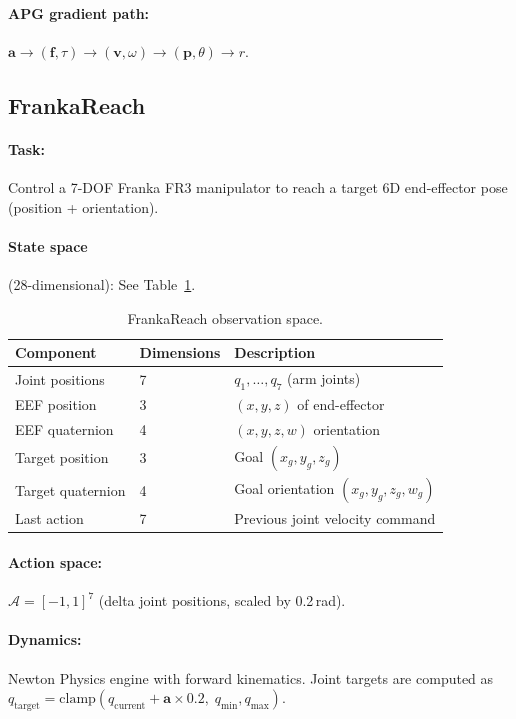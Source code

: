 \documentclass[11pt,a4paper]{article}
\newcommand{\cA}{\mathcal{A}}
\newcommand{\bvf}{\mathbf{v}}
\newcommand{\bpf}{\mathbf{p}}
\newcommand{\bff}{\mathbf{f}}
\newcommand{\ba}{\mathbf{a}}
\begin{document}
\paragraph{APG gradient path:} $\ba \rightarrow (\bff, \tau) \rightarrow (\bvf, \omega) \rightarrow (\bpf, \theta) \rightarrow r$.

\subsection{FrankaReach}
\label{sec:env_franka}

\paragraph{Task:} Control a 7-DOF Franka FR3 manipulator to reach a target 6D end-effector pose (position + orientation).

\paragraph{State space} (28-dimensional): See Table~\ref{tab:fr_obs}.

\begin{table}[htbp]
  \centering
  \caption{FrankaReach observation space.}
  \label{tab:fr_obs}
  \begin{tabular}{@{}lll@{}}
    \toprule
    \textbf{Component} & \textbf{Dimensions} & \textbf{Description} \\
    \midrule
    Joint positions     & 7 & $q_1, \ldots, q_7$ (arm joints) \\
    EEF position        & 3 & $(x, y, z)$ of end-effector \\
    EEF quaternion      & 4 & $(x, y, z, w)$ orientation \\
    Target position     & 3 & Goal $(x_g, y_g, z_g)$ \\
    Target quaternion   & 4 & Goal orientation $(x_g, y_g, z_g, w_g)$ \\
    Last action         & 7 & Previous joint velocity command \\
    \bottomrule
  \end{tabular}
\end{table}

\paragraph{Action space:} $\cA = [-1, 1]^7$ (delta joint positions, scaled by 0.2\,rad).

\paragraph{Dynamics:} Newton Physics engine with forward kinematics. Joint targets are computed as $q_{\text{target}} = \text{clamp}(q_{\text{current}} + \ba \times 0.2, \; q_{\text{min}}, q_{\text{max}})$.
\end{document}
